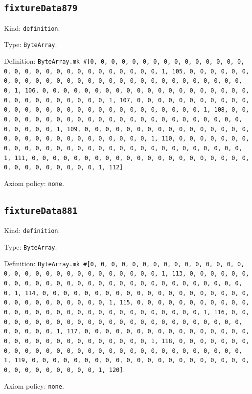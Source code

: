 \documentclass[11pt]{article}
\begin{document}
\subsection*{\texttt{fixtureData879}}
\noindent Kind: \texttt{definition}.\par
\noindent Type: \texttt{ByteArray}.\par
\noindent Definition: \texttt{ByteArray.mk \#[0, 0, 0, 0, 0, 0, 0, 0, 0, 0, 0, 0, 0, 0, 0, 0, 0, 0, 0, 0, 0, 0, 0, 0, 0, 0, 0, 0, 0, 0, 1, 105, 0, 0, 0, 0, 0, 0, 0, 0, 0, 0, 0, 0, 0, 0, 0, 0, 0, 0, 0, 0, 0, 0, 0, 0, 0, 0, 0, 0, 0, 0, 1, 106, 0, 0, 0, 0, 0, 0, 0, 0, 0, 0, 0, 0, 0, 0, 0, 0, 0, 0, 0, 0, 0, 0, 0, 0, 0, 0, 0, 0, 0, 0, 1, 107, 0, 0, 0, 0, 0, 0, 0, 0, 0, 0, 0, 0, 0, 0, 0, 0, 0, 0, 0, 0, 0, 0, 0, 0, 0, 0, 0, 0, 0, 0, 1, 108, 0, 0, 0, 0, 0, 0, 0, 0, 0, 0, 0, 0, 0, 0, 0, 0, 0, 0, 0, 0, 0, 0, 0, 0, 0, 0, 0, 0, 0, 0, 1, 109, 0, 0, 0, 0, 0, 0, 0, 0, 0, 0, 0, 0, 0, 0, 0, 0, 0, 0, 0, 0, 0, 0, 0, 0, 0, 0, 0, 0, 0, 0, 1, 110, 0, 0, 0, 0, 0, 0, 0, 0, 0, 0, 0, 0, 0, 0, 0, 0, 0, 0, 0, 0, 0, 0, 0, 0, 0, 0, 0, 0, 0, 0, 1, 111, 0, 0, 0, 0, 0, 0, 0, 0, 0, 0, 0, 0, 0, 0, 0, 0, 0, 0, 0, 0, 0, 0, 0, 0, 0, 0, 0, 0, 0, 0, 1, 112]}.\par
\noindent Axiom policy: \texttt{none}.\par
\subsection*{\texttt{fixtureData881}}
\noindent Kind: \texttt{definition}.\par
\noindent Type: \texttt{ByteArray}.\par
\noindent Definition: \texttt{ByteArray.mk \#[0, 0, 0, 0, 0, 0, 0, 0, 0, 0, 0, 0, 0, 0, 0, 0, 0, 0, 0, 0, 0, 0, 0, 0, 0, 0, 0, 0, 0, 0, 1, 113, 0, 0, 0, 0, 0, 0, 0, 0, 0, 0, 0, 0, 0, 0, 0, 0, 0, 0, 0, 0, 0, 0, 0, 0, 0, 0, 0, 0, 0, 0, 1, 114, 0, 0, 0, 0, 0, 0, 0, 0, 0, 0, 0, 0, 0, 0, 0, 0, 0, 0, 0, 0, 0, 0, 0, 0, 0, 0, 0, 0, 0, 0, 1, 115, 0, 0, 0, 0, 0, 0, 0, 0, 0, 0, 0, 0, 0, 0, 0, 0, 0, 0, 0, 0, 0, 0, 0, 0, 0, 0, 0, 0, 0, 0, 1, 116, 0, 0, 0, 0, 0, 0, 0, 0, 0, 0, 0, 0, 0, 0, 0, 0, 0, 0, 0, 0, 0, 0, 0, 0, 0, 0, 0, 0, 0, 0, 1, 117, 0, 0, 0, 0, 0, 0, 0, 0, 0, 0, 0, 0, 0, 0, 0, 0, 0, 0, 0, 0, 0, 0, 0, 0, 0, 0, 0, 0, 0, 0, 1, 118, 0, 0, 0, 0, 0, 0, 0, 0, 0, 0, 0, 0, 0, 0, 0, 0, 0, 0, 0, 0, 0, 0, 0, 0, 0, 0, 0, 0, 0, 0, 1, 119, 0, 0, 0, 0, 0, 0, 0, 0, 0, 0, 0, 0, 0, 0, 0, 0, 0, 0, 0, 0, 0, 0, 0, 0, 0, 0, 0, 0, 0, 0, 1, 120]}.\par
\noindent Axiom policy: \texttt{none}.\par
\end{document}
